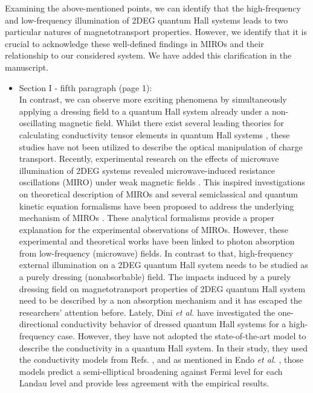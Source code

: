 \documentclass{article}
\begin{document}
Examining the above-mentioned points, we can identify that the high-frequency and low-frequency illumination of 2DEG quantum Hall systems leads to two particular natures of magnetotransport properties.
However, we identify that it is crucial to acknowledge these well-defined findings in MIROs and their relationship to our considered system. We have added this clarification in the manuscript.

\begin{itemize}
  \item Section I - fifth paragraph (page 1):\\
  {\color{Maroon}
  In contrast, we can observe more exciting phenomena by simultaneously applying a dressing field to a quantum Hall system already under a non-oscillating magnetic field.
  Whilst there exist several leading theories for calculating conductivity tensor elements in quantum Hall systems \cite{ando74_1,ando82,endo09}, these studies  have not been utilized to describe the optical manipulation of charge transport. Recently, experimental research on the effects of microwave illumination of 2DEG systems revealed microwave-induced resistance oscillations (MIRO) under weak magnetic fields \cite{zudov01,mani02,zudov03,mani04}.
  This inspired investigations on theoretical description of MIROs and several semiclassical and quantum kinetic equation formalisms have been proposed to address the underlying mechanism of MIROs \cite{durst03,dmitriev03,dmitriev05,dmitriev09}. These analytical formalisms provide a proper explanation for the experimental observations of MIROs. However, these experimental and theoretical works have been linked to photon absorption from low-frequency (microwave) fields.
  In contrast to that, high-frequency external illumination on a 2DEG quantum Hall system needs to be studied as a purely dressing (nonabsorbable) field.
  The impacts induced by a purely dressing field on magnetotransport properties of 2DEG quantum Hall system need to be described by a non absorption mechanism and it has escaped the researchers’ attention before.
  Lately, Dini \textit{et al.} \cite{dini16} have investigated the one-directional conductivity behavior of dressed quantum Hall systems for a high-frequency case. However, they have not adopted the state-of-the-art model to describe the conductivity in a quantum Hall system. In their study, they used the conductivity models from Refs. \cite{ando74_1,ando82}, and as mentioned in Endo \textit{et al.} \cite{endo09}, those models predict a semi-elliptical broadening against Fermi level for each Landau level and provide less agreement with the empirical results.
}
\end{itemize}
\end{document}
